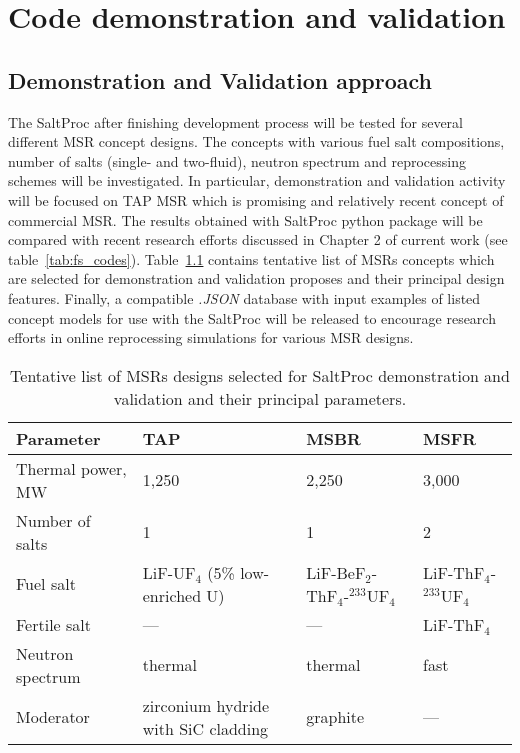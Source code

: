 \chapter[Code demonstration and validation]{Code demonstration and validation}

\section{Demonstration and Validation approach}
The SaltProc after finishing development process will be tested for several 
different \gls{MSR} concept designs. The concepts with various fuel salt 
compositions, number of salts (single- and two-fluid), neutron spectrum and 
reprocessing schemes will be investigated. In particular, demonstration 
and validation activity will be focused on \gls{TAP} \gls{MSR} which is 
promising and relatively recent concept of commercial \gls{MSR}. The results 
obtained with SaltProc python package will be compared with recent research 
efforts 
discussed in Chapter 2 of current work (see table~\ref{tab:fs_codes}). 
Table~\ref{tab:msr_concepts} 
contains tentative list of \glspl{MSR} concepts which are selected for 
demonstration and validation proposes and their principal design features. 
Finally, a compatible \textit{.JSON} database with input examples of listed 
concept models for use with the SaltProc will be released to encourage 
research efforts in online reprocessing simulations for various 
\gls{MSR} designs.
\begin{table}[!htb]
  \centering
  \caption{Tentative list of \glspl{MSR} designs selected for SaltProc 
  demonstration and validation and their principal parameters.}
  \label{tab:msr_concepts} 
  \begin{tabular}{p{} p{} p{} p{} } \toprule 
   Parameter & \gls{TAP} & \gls{MSBR} & \gls{MSFR}  \\ \midrule
   Thermal power, MW	&  1,250   & 2,250     & 3,000     \\ 
   Number of salts      & 1 		& 1 		& 2  		\\ 
   Fuel salt 			& LiF-UF$_4$ \newline (5\% low-enriched U) & LiF-BeF$_2$-ThF$_4$-$^{233}$UF$_4$ & 
   LiF-ThF$_4$-$^{233}$UF$_4$  \\
   Fertile salt 		& --- & --- &   LiF-ThF$_4$  \\
   Neutron spectrum     & thermal  & thermal & fast \\
   Moderator            & zirconium hydride with SiC cladding  & graphite & --- \\
     \bottomrule 
   \end{tabular}
\end{table}

